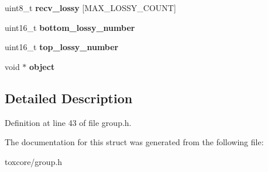\begin{DoxyCompactItemize}
\item 
\hypertarget{struct_group___peer_acf8dd69bcbe4de0b5a2b78803925994d}{uint8\+\_\+t {\bfseries recv\+\_\+lossy} \mbox{[}M\+A\+X\+\_\+\+L\+O\+S\+S\+Y\+\_\+\+C\+O\+U\+N\+T\mbox{]}}\label{struct_group___peer_acf8dd69bcbe4de0b5a2b78803925994d}

\item 
\hypertarget{struct_group___peer_ae3d9bdf641a1085fcb1bde6ec076b37d}{uint16\+\_\+t {\bfseries bottom\+\_\+lossy\+\_\+number}}\label{struct_group___peer_ae3d9bdf641a1085fcb1bde6ec076b37d}

\item 
\hypertarget{struct_group___peer_a9af1180e5be1617fd013dee9ce29bf24}{uint16\+\_\+t {\bfseries top\+\_\+lossy\+\_\+number}}\label{struct_group___peer_a9af1180e5be1617fd013dee9ce29bf24}

\item 
\hypertarget{struct_group___peer_a077376d12464f945e2414d5499c79b3f}{void $\ast$ {\bfseries object}}\label{struct_group___peer_a077376d12464f945e2414d5499c79b3f}

\end{DoxyCompactItemize}


\subsection{Detailed Description}


Definition at line 43 of file group.\+h.



The documentation for this struct was generated from the following file\+:\begin{DoxyCompactItemize}
\item 
toxcore/group.\+h\end{DoxyCompactItemize}
